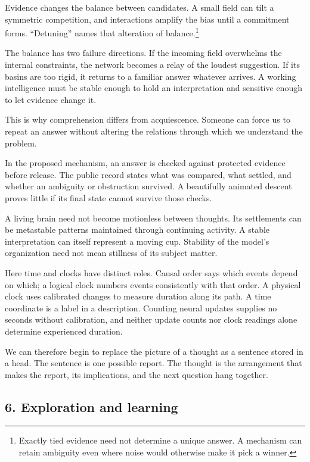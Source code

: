 \documentclass[
  11pt,
]{article}
\begin{document}
Evidence changes the balance between candidates. A small field can tilt
a symmetric competition, and interactions amplify the bias
until a commitment forms. ``Detuning'' names that alteration of
balance.\footnote{Exactly tied evidence need not determine a unique
  answer. A mechanism can retain ambiguity even where noise would
  otherwise make it pick a winner.}

The balance has two failure directions. If the incoming field overwhelms
the internal constraints, the network becomes a relay of the loudest
suggestion. If its basins are too rigid, it returns to a familiar answer
whatever arrives. A working intelligence must be stable enough to hold
an interpretation and sensitive enough to let evidence change it.

This is why comprehension differs from acquiescence. Someone can force
us to repeat an answer without altering the relations through which we
understand the problem.

In the proposed mechanism, an answer is checked against protected
evidence before release. The public record states what was compared,
what settled, and whether an ambiguity or obstruction survived. A
beautifully animated descent proves little if its final state cannot
survive those checks.

A living brain need not become motionless between thoughts. Its
settlements can be metastable patterns maintained through continuing
activity. A stable interpretation can itself represent a moving cup.
Stability of the model's organization need not mean stillness of its
subject matter.

Here time and clocks have distinct roles. Causal order says which events
depend on which; a logical clock numbers events consistently with that
order. A physical clock uses calibrated changes to measure duration
along its path. A time coordinate is a label in a description. Counting
neural updates supplies no seconds without calibration, and neither
update counts nor clock readings alone determine experienced duration.

We can therefore begin to replace the picture of a thought as a sentence
stored in a head. The sentence is one possible report. The thought is
the arrangement that makes the report, its implications, and the next
question hang together.

\subsection{6. Exploration and learning}\label{exploration-and-learning}
\end{document}
